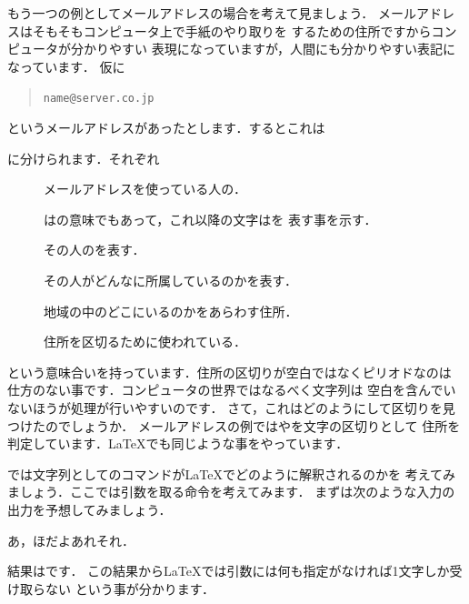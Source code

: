 もう一つの例としてメールアドレスの場合を考えて見ましょう．
メールアドレスはそもそもコンピュータ上で手紙のやり取りを
するための住所ですからコンピュータが分かりやすい
表現になっていますが，人間にも分かりやすい表記になっています．
仮に
\begin{quote}
\verb|name@server.co.jp|
\end{quote}
というメールアドレスがあったとします．するとこれは
\begin{quote}
  
   
\end{quote}
に分けられます．それぞれ
\begin{description}
 \item[] メールアドレスを使っている人の．
 \item[]   \qu{\str@}はの意味でもあって，これ以降の文字はを
	    表す事を示す．
 \item[] その人のを表す．
 \item[] その人がどんなに所属しているのかを表す．
 \item[] 地域の中のどこにいるのかをあらわす住所．
 \item[] 住所を区切るために使われている．
\end{description}
という意味合いを持っています．住所の区切りが空白ではなくピリオドなのは
仕方のない事です．コンピュータの世界ではなるべく文字列は
空白を含んでいないほうが処理が行いやすいのです．
さて，これはどのようにして区切りを見つけたのでしょうか．
メールアドレスの例ではやを文字の区切りとして
住所を判定しています．{\LaTeX}でも同じような事をやっています．

では文字列としてのコマンドが{\LaTeX}でどのように解釈されるのかを
考えてみましょう．ここでは引数を取る命令を考えてみます．
まずは次のような入力の出力を予想してみましょう．

\begin{InTeX}
\newcommand{\OneArg}[1]{あ，#1だよ}
\OneArg ほあれそれ．
\end{InTeX}

結果はです．
この結果から{\LaTeX}では引数には何も指定がなければ1文字しか受け取らない
という事が分かります．

